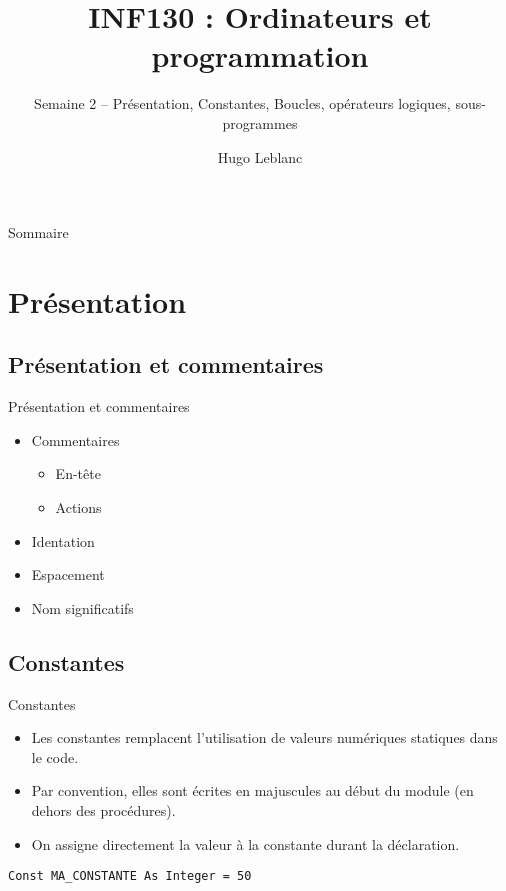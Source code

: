 \documentclass[aspectratio=169,usenames,dvipsnames]{beamer}
\title{INF130 : Ordinateurs et programmation}
\subtitle{Semaine 2 – Présentation, Constantes, Boucles, opérateurs logiques, sous-programmes}
\author{Hugo Leblanc}
\begin{document}
    \maketitle

    \begin{frame}{Sommaire}
        \tableofcontents
    \end{frame}

    \section{Présentation}
    \subsection{Présentation et commentaires}
    \begin{frame}{Présentation et commentaires}
        \begin{itemize}
            \item Commentaires
            \begin{itemize}
                \item En-tête
                \item Actions
            \end{itemize}
            \item Identation
            \item Espacement
            \item Nom significatifs
        \end{itemize}
    \end{frame}
    \subsection{Constantes}
    \begin{frame}[fragile]{Constantes}
        \begin{itemize}
            \item Les constantes remplacent l’utilisation de valeurs numériques statiques dans le code.
            \item Par convention, elles sont écrites en majuscules au début du module (en dehors des procédures).
            \item On assigne directement la valeur à la constante durant la déclaration.
        \end{itemize}
        \begin{lstlisting}
Const MA_CONSTANTE As Integer = 50
        \end{lstlisting}
    \end{frame}
\end{document}
